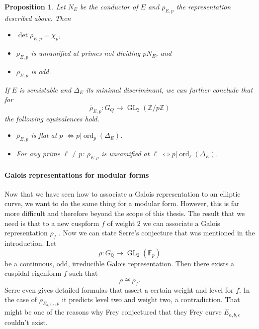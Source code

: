 \documentclass{article}
\theoremstyle{plain}%
\newtheorem{proposition}[theorem]{Proposition}
\theoremstyle{definition}
\theoremstyle{remark}
\newcommand{\GL}{\operatorname{GL}}
\begin{document}
\begin{proposition}\cite[chapter 1, theorem 2.11]{Cornell1997}\label{prop:rhoEpproperties} 
    Let \(N_E\) be the conductor of \(E\) and \(\rho_{E,p}\) the representation described above.
    Then
    \begin{itemize}
        \item \(\det \rho_{E,p} = \chi_p\),
        \item \(\rho_{E,p}\) is unramified at primes not dividing \(pN_E\), and
        \item \(\rho_{E, p}\) is odd.
    \end{itemize}
    If \(E\) is semistable and \(\Delta_E\) its minimal discriminant, we can further conclude that for
    \[
        \overline{\rho}_{E,p}\colon G_Q \to \GL_2(\mathbb{Z}/p\mathbb{Z})  
    \]
    the following equivalences hold.
    \begin{itemize}
        \item \(\overline{\rho}_{E,p}\) is flat at \(p\) \(\Leftrightarrow p| \operatorname{ord}_p(\Delta_E)\).
        \item For any prime \(\ell \neq p\): 
        \(\overline{\rho}_{E,p}\) is unramified at \(\ell\) \(\Leftrightarrow p| \operatorname{ord}_\ell(\Delta_E)\).
    \end{itemize}
\end{proposition}

\paragraph{Galois representations for modular forms}
Now that we have seen how to associate a Galois representation to an elliptic curve, we want to
do the same thing for a modular form. However, this is far more difficult and therefore beyond 
the scope of this thesis.
The result that we need is that to a new cuspform \(f\) of weight \(2\) we can associate a 
Galois representation \(\rho_f\) \cite[see][section 9.5]{Diamond2007}.
Now we can state Serre's conjecture that was mentioned in the introduction.
Let
\[
    \rho\colon G_\mathbb{Q} \to \GL_2(\mathbb{F}_p)
\]
be a continuous, odd, irreducible Galois representation. 
Then there exists a cuspidal eigenform \(f\) such that 
\[
    \rho \cong \rho_f.
\]
Serre even gives detailed formulas that assert a certain weight and level for \(f\).
In the case of \(\rho_{E_{a,b,c},p}\) it predicts level two and weight two, a contradiction.
That might be one of the reasons why Frey  conjectured that they Frey curve \(E_{a,b,c}\) couldn't exist.
\end{document}

